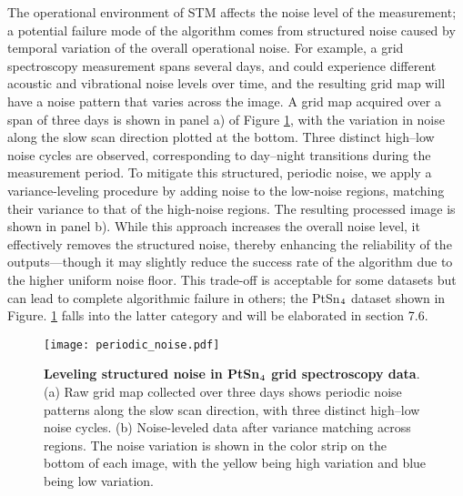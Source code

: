 The operational environment of STM affects the noise level of the measurement; a potential failure mode of the algorithm comes from structured noise caused by temporal variation of the overall operational noise. For example, a grid spectroscopy measurement spans several days, and could experience different acoustic and vibrational noise levels over time, and the resulting grid map will have a noise pattern that varies across the image. A grid map acquired over a span of three days is shown in panel a) of Figure \ref{fig:periodic_noise}, with the variation in noise along the slow scan direction plotted at the bottom. Three distinct high–low noise cycles are observed, corresponding to day–night transitions during the measurement period. To mitigate this structured, periodic noise, we apply a variance-leveling procedure by adding noise to the low-noise regions, matching their variance to that of the high-noise regions. The resulting processed image is shown in panel b). While this approach increases the overall noise level, it effectively removes the structured noise, thereby enhancing the reliability of the outputs—though it may slightly reduce the success rate of the algorithm due to the higher uniform noise floor. This trade-off is acceptable for some datasets but can lead to complete algorithmic failure in others; the PtSn$\textsubscript{4}$ dataset shown in Figure. \ref{fig:periodic_noise} falls into the latter category and will be elaborated in section 7.6. 



\begin{figure}
	\texttt{[image: periodic\_noise.pdf]} 
	\centering
	\caption[\textbf{Leveling structured noise in PtSn$\textsubscript{4}$ grid spectroscopy data}]{\textbf{Leveling structured noise in PtSn$\textsubscript{4}$ grid spectroscopy data}. (a) Raw grid map collected over three days shows periodic noise patterns along the slow scan direction, with three distinct high–low noise cycles. (b) Noise-leveled data after variance matching across regions. The noise variation is shown in the color strip on the bottom of each image, with the yellow being high variation and blue being low variation.}
	\label{fig:periodic_noise}
\end{figure}

